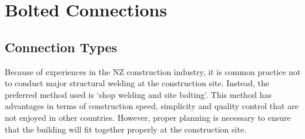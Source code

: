 \chapter{Bolted Connections}\label{ch:bolt}
\section{Connection Types}
Because of experiences in the NZ construction industry, it is common practice not to conduct major structural welding at the construction site. Instead, the preferred method used is `shop welding and site bolting'. This method has advantages in terms of construction speed, simplicity and quality control that are not enjoyed in other countries. However, proper planning is necessary to ensure that the building will fit together properly at the construction site.

